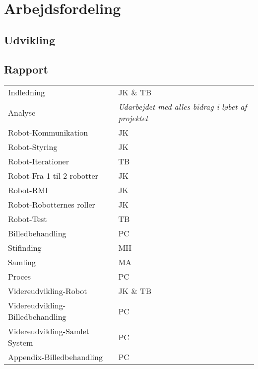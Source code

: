 \chapter{Arbejdsfordeling}\label{app:whodidwhat}
\section*{Udvikling}

\section*{Rapport}
\begin{tabular}{l l}
	Indledning & JK \& TB \\
	Analyse & \textit{Udarbejdet med alles bidrag i løbet af projektet} \\
	Robot-Kommunikation & JK \\
	Robot-Styring & JK \\
	Robot-Iterationer & TB \\
	Robot-Fra 1 til 2 robotter & JK \\
	Robot-RMI & JK \\
	Robot-Robotternes roller & JK \\
	Robot-Test & TB \\
	Billedbehandling & PC \\
	Stifinding & MH \\
	Samling & MA \\
	Proces & PC \\
	Videreudvikling-Robot & JK \& TB \\
	Videreudvikling-Billedbehandling & PC \\
	Videreudvikling-Samlet System & PC \\
	Appendix-Billedbehandling & PC
\end{tabular}